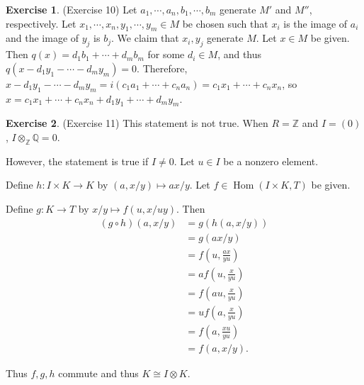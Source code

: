 \documentclass[12pt, psamsfonts]{amsart}
\theoremstyle{definition}
\newtheorem*{exer}{Exercise}
\theoremstyle{remark}
\DeclareMathOperator{\Hom}{Hom}
\numberwithin{equation}{section}
\begin{document}
\begin{exer}{(Exercise 10)}
  Let $a_1, \cdots, a_n, b_1, \cdots, b_m$ generate $M'$ and $M''$, respectively.
  Let $x_1, \cdots, x_n, y_1, \cdots, y_m \in M$ be chosen such that $x_i$ is the image of $a_i$ and the image of $y_j$ is $b_j$.
  We claim that $x_i, y_j$ generate $M$.
  Let $x \in M$ be given.
  Then $q(x) = d_1b_1 + \cdots + d_mb_m$ for some $d_i \in M$, and thus $q(x - d_1y_1 - \cdots - d_my_m) = 0$.
  Therefore, $x - d_1y_1 - \cdots - d_my_m = i(c_1a_1 + \cdots + c_na_n) = c_1x_1 + \cdots + c_nx_n$, so $x = c_1x_1 + \cdots + c_nx_n + d_1y_1 + \cdots + d_my_m$.
\end{exer}

\begin{exer}{(Exercise 11)}
  This statement is not true.
  When $R = \mathbb{Z}$ and $I = (0)$, $I \otimes_{\mathbb{Z}} \mathbb{Q} = 0$.

  However, the statement is true if $I \ne 0$.
  Let $u \in I$ be a nonzero element.

  Define $h: I \times K \rightarrow K$ by $(a, x / y) \mapsto ax / y$.
  Let $f \in \Hom(I \times K, T)$ be given.

  Define $g: K \rightarrow T$ by $x / y \mapsto f(u, x / uy)$.
  Then 
  \begin{align*}
    (g \circ h)(a, x / y)
      &= g(h(a, x / y)) \\
      &= g(ax / y) \\
      &= f(u, \frac{ax}{yu}) \\
      &= af(u, \frac{x}{yu}) \\
      &= f(au, \frac{x}{yu}) \\
      &= uf(a, \frac{x}{yu}) \\
      &= f(a, \frac{xu}{yu}) \\
      &= f(a, x/y).
  \end{align*}

  Thus $f, g, h$ commute and thus $K \cong I \otimes K$.
\end{exer}
\end{document}
